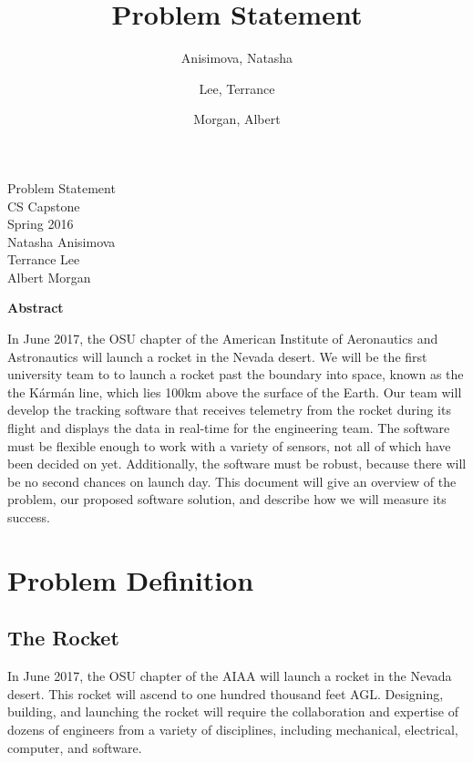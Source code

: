 \documentclass[10pt,journal,draftclsnofoot,onecolumn]{IEEEtran}
\begin{document}
\singlespace

\title{\vspace{2in}Problem Statement}

\author {
	Anisimova, Natasha
	\and
	Lee, Terrance
	\and
	Morgan, Albert
}


\pagestyle{empty}
\vspace*{2in}
\begin{center}
\huge
Problem Statement\\
\normalsize
\vspace{5mm}
CS Capstone\\
Spring 2016\\
\vspace{5mm}
Natasha Anisimova\\
Terrance Lee\\
Albert Morgan
\end{center}

\vspace{5mm}

\begin{center}
\textbf{Abstract}
\end{center}

\begin{adjustwidth}{2in}{2in}
In June 2017, the \ac{OSU} chapter of the
American Institute of Aeronautics and Astronautics will launch a rocket in the Nevada desert.
We will be the first university team to to launch a rocket past the boundary into space,
known as the the K\'{a}rm\'{a}n line, which lies 100km above the surface of the Earth.
Our team will develop the tracking software that receives
telemetry from the rocket during its flight
and displays the data in real-time for the engineering team.
The software must be flexible enough to work with a variety of sensors,
not all of which have been decided on yet.
Additionally, the software must be robust,
because there will be no second chances on launch day.
This document will give an overview of the problem,
our proposed software solution,
and describe how we will measure its success.
\end{adjustwidth}

\newpage
\pagestyle{headings}
\section{Problem Definition}
\subsection{The Rocket}
In June 2017, the \ac{OSU} chapter of the
\ac{AIAA} will launch a rocket in the Nevada desert.
This rocket will ascend to one hundred thousand feet \ac{AGL}.
Designing, building, and launching the rocket will require the
collaboration and expertise of dozens of engineers from a variety
of disciplines, including mechanical, electrical, computer, and
software.
\end{document}
